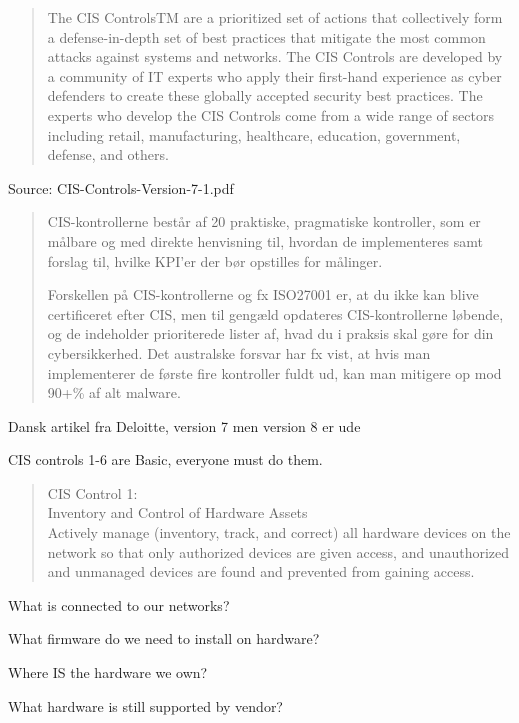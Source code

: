 \documentclass[Screen16to9,17pt]{foils}
\begin{document}
\begin{quote}
  The CIS ControlsTM are a prioritized set of actions that collectively form a defense-in-depth set
of best practices that mitigate the most common attacks against systems and networks. The
CIS Controls are developed by a community of IT experts who apply their first-hand experience
as cyber defenders to create these globally accepted security best practices. The experts who
develop the CIS Controls come from a wide range of sectors including retail, manufacturing,
healthcare, education, government, defense, and others.
\end{quote}

Source:  CIS-Controls-Version-7-1.pdf



\begin{quote}
CIS-kontrollerne består af 20 praktiske, pragmatiske kontroller, som er målbare og med direkte henvisning til, hvordan de implementeres samt forslag til, hvilke KPI’er der bør opstilles for målinger.

Forskellen på CIS-kontrollerne og fx ISO27001 er, at du ikke kan blive certificeret efter CIS, men til gengæld opdateres CIS-kontrollerne løbende, og de indeholder prioriterede lister af, hvad du i praksis skal gøre for din cybersikkerhed. Det australske forsvar har fx vist, at hvis man implementerer de første fire kontroller fuldt ud, kan man mitigere op mod 90+\% af alt malware.
\end{quote}

Dansk artikel fra Deloitte, version 7 men version 8 er ude


CIS controls 1-6 are Basic, everyone must do them.


\begin{quote}
CIS Control 1:\\
Inventory and Control of Hardware Assets\\
Actively manage (inventory, track, and correct) all hardware devices on the network so that only authorized devices are given access, and unauthorized and unmanaged devices are found and prevented from gaining access.
\end{quote}

\begin{list1}
\item What is connected to our networks?
\item What firmware do we need to install on hardware?
\item Where IS the hardware we own?
\item What hardware is still supported by vendor?
\end{list1}
\end{document}
